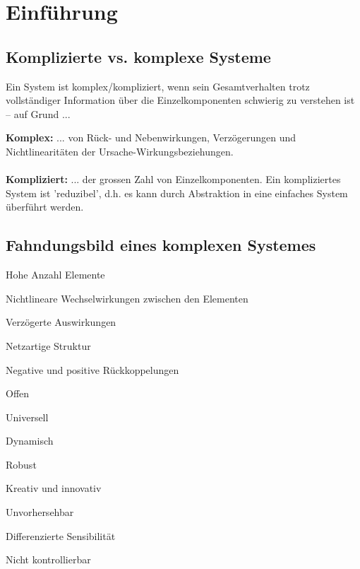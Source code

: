 \section{Einführung}
\subsection{Komplizierte vs. komplexe Systeme}
Ein System ist komplex/kompliziert, wenn sein Gesamtverhalten trotz vollständiger Information über die Einzelkomponenten schwierig zu verstehen ist – auf Grund ...
\begin{multicols}{2}
	\textbf{Komplex:} ... von Rück- und Nebenwirkungen, Verzögerungen und Nichtlinearitäten der Ursache-Wirkungsbeziehungen. \\ \ \\
	\textbf{Kompliziert:} ... der grossen Zahl von Einzelkomponenten. Ein kompliziertes System ist 'reduzibel', d.h. es kann durch Abstraktion in eine einfaches System überführt werden.
\end{multicols}

\subsection{Fahndungsbild eines komplexen Systemes}
\begin{multicols}{3}
	\begin{compactitem}
		\item Hohe Anzahl Elemente
		\item Nichtlineare Wechselwirkungen zwischen den Elementen
		\item Verzögerte Auswirkungen		
		\item Netzartige Struktur
		\item Negative und positive Rückkoppelungen
		\item Offen
		\item Universell
		\item Dynamisch
		\item Robust
		\item Kreativ und innovativ
		\item Unvorhersehbar
		\item Differenzierte Sensibilität
		\item Nicht kontrollierbar
	\end{compactitem}
\end{multicols}

